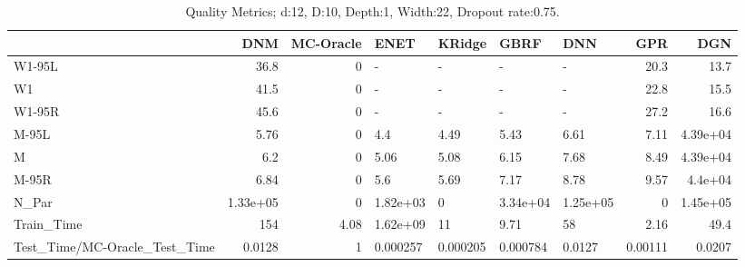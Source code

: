 \begin{table}
\centering
\caption{Quality Metrics; d:12, D:10, Depth:1, Width:22, Dropout rate:0.75.}
\begin{tabular}{lrrllllrr}
\toprule
{} &      DNM &  MC-Oracle &     ENET &   KRidge &     GBRF &      DNN &     GPR &      DGN \\
\midrule
W1-95L                        &     36.8 &          0 &        - &        - &        - &        - &    20.3 &     13.7 \\
W1                            &     41.5 &          0 &        - &        - &        - &        - &    22.8 &     15.5 \\
W1-95R                        &     45.6 &          0 &        - &        - &        - &        - &    27.2 &     16.6 \\
M-95L                         &     5.76 &          0 &      4.4 &     4.49 &     5.43 &     6.61 &    7.11 & 4.39e+04 \\
M                             &      6.2 &          0 &     5.06 &     5.08 &     6.15 &     7.68 &    8.49 & 4.39e+04 \\
M-95R                         &     6.84 &          0 &      5.6 &     5.69 &     7.17 &     8.78 &    9.57 &  4.4e+04 \\
N\_Par                         & 1.33e+05 &          0 & 1.82e+03 &        0 & 3.34e+04 & 1.25e+05 &       0 & 1.45e+05 \\
Train\_Time                    &      154 &       4.08 & 1.62e+09 &       11 &     9.71 &       58 &    2.16 &     49.4 \\
Test\_Time/MC-Oracle\_Test\_Time &   0.0128 &          1 & 0.000257 & 0.000205 & 0.000784 &   0.0127 & 0.00111 &   0.0207 \\
\bottomrule
\end{tabular}
\end{table}
